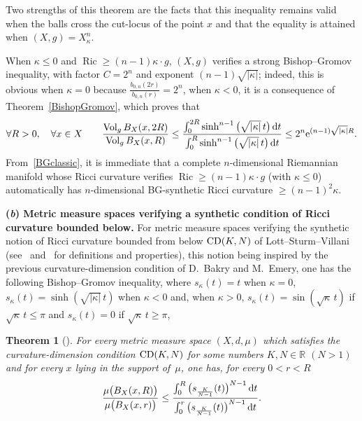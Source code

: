 \documentclass[10pt,a4paper]{amsart}
\numberwithin{equation}{section}
\newtheorem{theor}{Theorem}[section]
\newcommand{\R}{\mathbb{R}}
\newcommand{\Vol}{\operatorname{Vol}}
\newcommand{\Ric}{\operatorname{Ric}}
\begin{document}
Two strengths of this theorem are the facts that this inequality remains valid when the balls cross the cut-locus of the point $x$ and that the equality is
attained when $(X,g) = X_{\kappa}^n$.

When $\kappa \le 0$ and $\Ric \ge (n-1) \kappa \cdot g $, $(X,g)$ verifies a strong Bishop--Gromov inequality, with factor $C = 2^n$ and exponent $(n-1) \sqrt{|\kappa|}$; indeed, this is obvious when $\kappa = 0$ because $\frac{b_{0, n} (2 r)}{b_{ 0, n} ( r)} = 2^n$,
when $\kappa < 0$, it is a consequence of Theorem~\ref{BishopGromov}, which proves that
\begin{gather}\label{BGclassic}
\forall R>0, \quad \forall x \in X \qquad\dfrac{\Vol_g B_X(x, 2 R)}{\Vol_g B_X(x, R)} \le \dfrac{\int_0^{2 R} \sinh ^{n-1} \big(\sqrt {|\kappa|}\, t\big)\, {\rm d}t}{\int_0^R \sinh ^{n-1} \big(\sqrt {|\kappa|}\, t\big)\, {\rm d}t} \le 2^n {\rm e}^{(n-1) \sqrt{|\kappa|} R}.
\end{gather}
From~\eqref{BGclassic}, it is immediate that a complete $n$-dimensional
Riemannian manifold whose Ricci curvature verifies $\Ric \ge (n-1) \kappa \cdot g $
(with $\kappa \le 0$) automatically has $n$-dimensional BG-synthetic Ricci curvature $\ge (n-1)^2 \kappa$.

\medskip\noindent
{\bf (\emph{b}) Metric measure spaces verifying a synthetic condition of Ricci curvature boun\-ded below.}
For metric measure spaces verifying the synthetic notion of Ricci curvature bounded from below ${\rm CD}(K,N)$ of Lott--Sturm--Villani (see~\cite{LV} and~\cite{St}
for definitions and properties), this notion being inspired by the previous curvature-dimension condition of D.~Bakry and M.~Emery, one has the following Bishop--Gromov inequality, where $s_{\kappa} (t) = t$ when $\kappa = 0$, $s_{\kappa} (t) = \sinh (\sqrt{|\kappa|}\, t)$ when $\kappa < 0$ and, when $\kappa > 0$, $s_ {\kappa} (t) = \sin (\sqrt{\kappa}\, t)
$ if $\sqrt{\kappa}\, t \le \pi$ and $s_{\kappa} (t) = 0$ if $\sqrt{\kappa}\, t \ge \pi$,

\begin{theor}[{\cite[Theorem~2.3]{St}}]\label{Bishopsynth}
For every metric measure space $(X,d,\mu)$ which satisfies the curvature-dimension
condition ${\rm CD}(K,N)$ for some numbers $K, N \in \R$ $(N > 1)$ and for every $x$ lying in the support of~$\mu$, one has, for every $0 < r < R$
\begin{gather*}
\dfrac{\mu \big(B_X(x, R)\big)}{\mu \big(B_X(x, r)\big)} \le \dfrac{\int_0^{R} \big(s_{\frac{K}{N-1}} (t)\big)^{N-1}\, {\rm d}t}{\int_0^{r} \big(s_{\frac{K}{N-1}} (t)\big)^{N-1}\, {\rm d}t}.
\end{gather*}
\end{theor}
\end{document}
